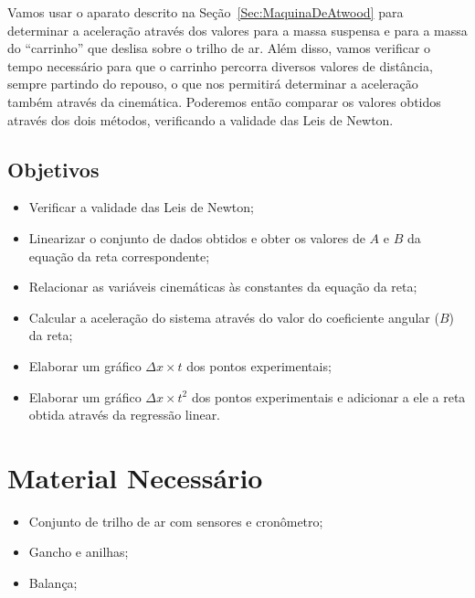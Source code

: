 Vamos usar o aparato descrito na Seção~\ref{Sec:MaquinaDeAtwood} para determinar a aceleração através dos valores para a massa suspensa e para a massa do ``carrinho'' que deslisa sobre o trilho de ar. Além disso, vamos verificar o tempo necessário para que o carrinho percorra diversos valores de distância, sempre partindo do repouso, o que nos permitirá determinar a aceleração também através da cinemática. Poderemos então comparar os valores obtidos através dos dois métodos, verificando a validade das Leis de Newton.

\subsection{Objetivos}

\begin{itemize}
     \item Verificar a validade das Leis de Newton;
	 \item Linearizar o conjunto de dados obtidos e obter os valores de $A$ e $B$ da equação da reta correspondente;
	 \item Relacionar as variáveis cinemáticas às constantes da equação da reta;
     \item Calcular a aceleração do sistema através do valor do coeficiente angular ($B$) da reta;
     \item Elaborar um gráfico $\Delta x \times t$ dos pontos experimentais;
	 \item Elaborar um gráfico $\Delta x \times t^2$ dos pontos experimentais e adicionar a ele a reta obtida através da regressão linear.
\end{itemize}

\section{Material Necessário}

\begin{itemize}
	\item Conjunto de trilho de ar com sensores e cronômetro;
	\item Gancho e anilhas;
	\item Balança;
\end{itemize}

